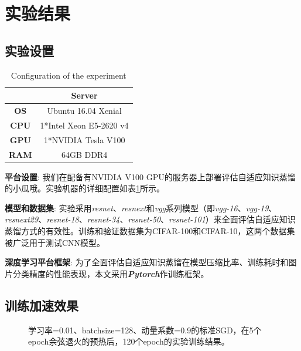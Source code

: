 \section{实验结果}
\subsection{实验设置}

\begin{table}[h]
	\caption{Configuration of the experiment}
	\centering
	\begin{tabular}{cc}
		\hline
		& \textbf{Server}                           \\ \hline
		\textbf{OS}  & Ubuntu 16.04 Xenial          \\ 
		\textbf{CPU} & 1*Intel Xeon E5-2620 v4      \\ 
		\textbf{GPU} & 1*NVIDIA Tesla V100          \\ 
		\textbf{RAM} & 64GB DDR4                   \\ \hline
	\end{tabular} %
	\label{configuration2}
\end{table}


\textbf{平台设置}: 我们在配备有NVIDIA V100 GPU的服务器上部署评估自适应知识蒸馏的小瓜哦。实验机器的详细配置如表\ref{configuration2}所示。

\textbf{模型和数据集}: 实验采用\emph{resnet}、\emph{resnext}和\emph{vgg}系列模型（即\emph{vgg-16}、\emph{vgg-19}、\emph{resnext29}、\emph{resnet-18}、\emph{resnet-34}、\emph{resnet-50}、\emph{resnet-101}）来全面评估自适应知识蒸馏方式的有效性。训练和验证数据集为CIFAR-100和CIFAR-10，这两个数据集被广泛用于测试CNN模型。

\textbf{深度学习平台框架}: 为了全面评估自适应知识蒸馏在模型压缩比率、训练耗时和图片分类精度的性能表现，本文采用\textbf{\emph{Pytorch}}作训练框架。

\subsection{训练加速效果}

\begin{figure}[!t]
	\centering
	
	
	\caption{学习率=0.01、batchsize=128、动量系数=0.9的标准SGD，在5个epoch余弦退火的预热后，120个epoch的实验训练结果。}
	\label{train_speed}
\end{figure}

